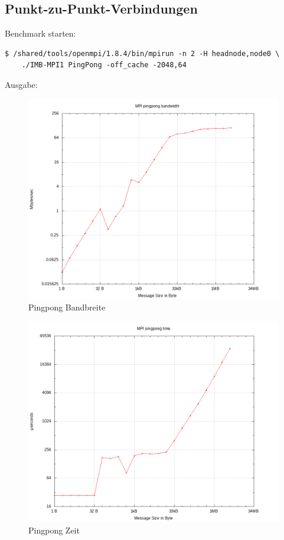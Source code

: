 \subsection{Punkt-zu-Punkt-Verbindungen}
Benchmark starten:
\begin{lstlisting}[style=Bash]
$ /shared/tools/openmpi/1.8.4/bin/mpirun -n 2 -H headnode,node0 \
	./IMB-MPI1 PingPong -off_cache -2048,64
\end{lstlisting}
Ausgabe:

\begin{figure}[H]
	\centering
	\includegraphics[scale=0.65]{../mpi_benchmark/pingpong_bandwidth.png} 
	\caption{Pingpong Bandbreite}
\end{figure}
\begin{figure}[H]
	\centering
	\includegraphics[scale=0.65]{../mpi_benchmark/pingpong_time.png}
	\caption{Pingpong Zeit}
\end{figure}
